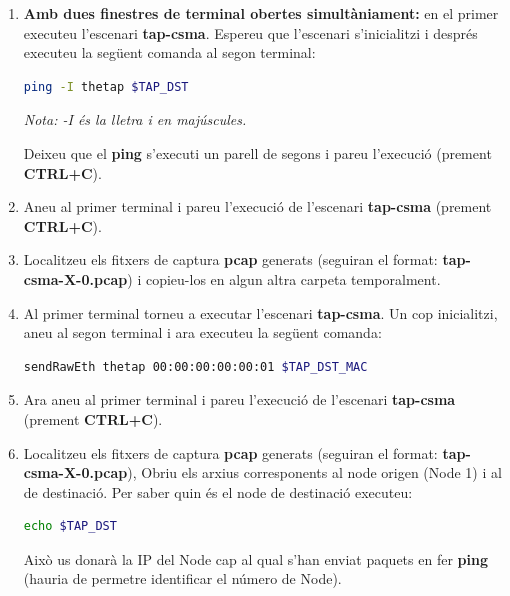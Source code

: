 \documentclass[12pt,a4paper]{article}
\newcounter{exercises}
\newtheorem{exer}[exercises]{Pregunta}
\begin{document}
\begin{enumerate}
\item \textbf{Amb dues finestres de terminal obertes simultàniament:} en el primer executeu l'escenari  \textbf{tap-csma}. Espereu que l'escenari s'inicialitzi i després executeu la següent comanda al segon terminal:
\begin{lstlisting}[language=bash]
 ping -I thetap $TAP_DST
\end{lstlisting}
\textit{Nota: -I és la lletra i en majúscules.}

Deixeu que el \textbf{ping} s'executi un parell de segons i pareu l'execució (prement \textbf{CTRL+C}).
%

\item Aneu al primer terminal i pareu l'execució de l'escenari \textbf{tap-csma} (prement \textbf{CTRL+C}).

\item Localitzeu els fitxers de captura \textbf{pcap} generats (seguiran el format: \textbf{tap-csma-X-0.pcap}) i copieu-los en algun altra carpeta temporalment.

\item Al primer terminal torneu a executar l'escenari \textbf{tap-csma}. Un cop inicialitzi, aneu al segon terminal i ara executeu la següent comanda:
\begin{lstlisting}[language=bash]
sendRawEth thetap 00:00:00:00:00:01 $TAP_DST_MAC
\end{lstlisting}
%
\item Ara aneu al primer terminal i pareu l'execució de l'escenari \textbf{tap-csma}  (prement \textbf{CTRL+C}).

\item Localitzeu els fitxers de captura \textbf{pcap} generats (seguiran el format: \textbf{tap-csma-X-0.pcap}),
Obriu els arxius corresponents al node origen (Node 1) i al de destinació. Per saber quin és el node de destinació executeu:
\begin{lstlisting}[language=bash]
 echo $TAP_DST
\end{lstlisting}
Això us donarà la IP del Node cap al qual s'han enviat paquets en fer \textbf{ping} (hauria de permetre identificar el número de Node).


\end{enumerate}
\end{document}
